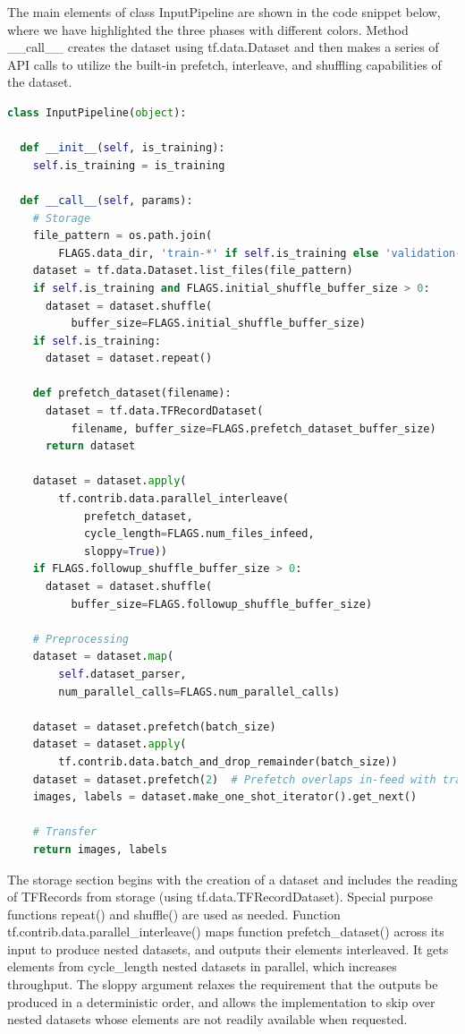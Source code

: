 \documentclass[14pt]{report}
\begin{document}
				The main elements of class InputPipeline are shown in the code snippet below, where we have highlighted the three phases with different colors. Method \_\_call\_\_ creates the dataset using tf.data.Dataset and then makes a series of API calls to utilize the built-in prefetch, interleave, and shuffling capabilities of the dataset.\\
				\begin{lstlisting}[language=Python]
class InputPipeline(object):

  def __init__(self, is_training):
    self.is_training = is_training

  def __call__(self, params):
    # Storage
    file_pattern = os.path.join(
        FLAGS.data_dir, 'train-*' if self.is_training else 'validation-*')
    dataset = tf.data.Dataset.list_files(file_pattern)
    if self.is_training and FLAGS.initial_shuffle_buffer_size > 0:
      dataset = dataset.shuffle(
          buffer_size=FLAGS.initial_shuffle_buffer_size)
    if self.is_training:
      dataset = dataset.repeat()

    def prefetch_dataset(filename):
      dataset = tf.data.TFRecordDataset(
          filename, buffer_size=FLAGS.prefetch_dataset_buffer_size)
      return dataset

    dataset = dataset.apply(
        tf.contrib.data.parallel_interleave(
            prefetch_dataset,
            cycle_length=FLAGS.num_files_infeed,
            sloppy=True))
    if FLAGS.followup_shuffle_buffer_size > 0:
      dataset = dataset.shuffle(
          buffer_size=FLAGS.followup_shuffle_buffer_size)

    # Preprocessing
    dataset = dataset.map(
        self.dataset_parser,
        num_parallel_calls=FLAGS.num_parallel_calls)

    dataset = dataset.prefetch(batch_size)
    dataset = dataset.apply(
        tf.contrib.data.batch_and_drop_remainder(batch_size))
    dataset = dataset.prefetch(2)  # Prefetch overlaps in-feed with training
    images, labels = dataset.make_one_shot_iterator().get_next()

    # Transfer
    return images, labels
				\end{lstlisting}

				The storage section begins with the creation of a dataset and includes the reading of TFRecords from storage (using tf.data.TFRecordDataset). Special purpose functions repeat() and shuffle() are used as needed. Function tf.contrib.data.parallel\_interleave() maps function prefetch\_dataset() across its input to produce nested datasets, and outputs their elements interleaved. It gets elements from cycle\_length nested datasets in parallel, which increases throughput. The sloppy argument relaxes the requirement that the outputs be produced in a deterministic order, and allows the implementation to skip over nested datasets whose elements are not readily available when requested.\\
\end{document}
